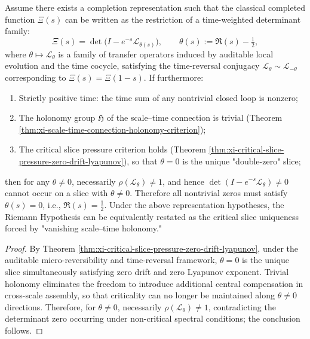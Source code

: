 \begin{theorem}\label{thm:xi-rh-cohomological-reduction-holonomy}
Assume there exists a completion representation such that the classical completed function \(\Xi(s)\) can be written as the restriction of a time-weighted determinant family:
\[
\Xi(s)=\det\!\bigl(I-e^{-s}\mathcal L_{\theta(s)}\bigr),
\qquad
\theta(s):=\Re(s)-\tfrac12,
\]
where \(\theta\mapsto\mathcal L_{\theta}\) is a family of transfer operators induced by auditable local evolution and the time cocycle, satisfying the time-reversal conjugacy
\(
\mathcal L_{\theta}\sim \mathcal L_{-\theta}
\)
corresponding to \(\Xi(s)=\Xi(1-s)\).
If furthermore:
\begin{enumerate}
  \item Strictly positive time: the time sum of any nontrivial closed loop is nonzero;
  \item The holonomy group \(\mathfrak H\) of the scale--time connection is trivial (Theorem \ref{thm:xi-scale-time-connection-holonomy-criterion});
  \item The critical slice pressure criterion holds (Theorem \ref{thm:xi-critical-slice-pressure-zero-drift-lyapunov}), so that \(\theta=0\) is the unique "double-zero" slice;
\end{enumerate}
then for any \(\theta\neq 0\), necessarily \(\rho(\mathcal L_{\theta})\neq 1\), and hence \(\det(I-e^{-s}\mathcal L_{\theta})\neq 0\) cannot occur on a slice with \(\theta\neq 0\).
Therefore all nontrivial zeros must satisfy \(\theta(s)=0\), i.e., \(\Re(s)=\tfrac12\).
Under the above representation hypotheses, the Riemann Hypothesis can be equivalently restated as the critical slice uniqueness forced by "vanishing scale--time holonomy."
\end{theorem}

\begin{proof}
By Theorem \ref{thm:xi-critical-slice-pressure-zero-drift-lyapunov}, under the auditable micro-reversibility and time-reversal framework, \(\theta=0\) is the unique slice simultaneously satisfying zero drift and zero Lyapunov exponent.
Trivial holonomy eliminates the freedom to introduce additional central compensation in cross-scale assembly, so that criticality can no longer be maintained along \(\theta\neq 0\) directions.
Therefore, for \(\theta\neq 0\), necessarily \(\rho(\mathcal L_{\theta})\neq 1\), contradicting the determinant zero occurring under non-critical spectral conditions; the conclusion follows.
\end{proof}

